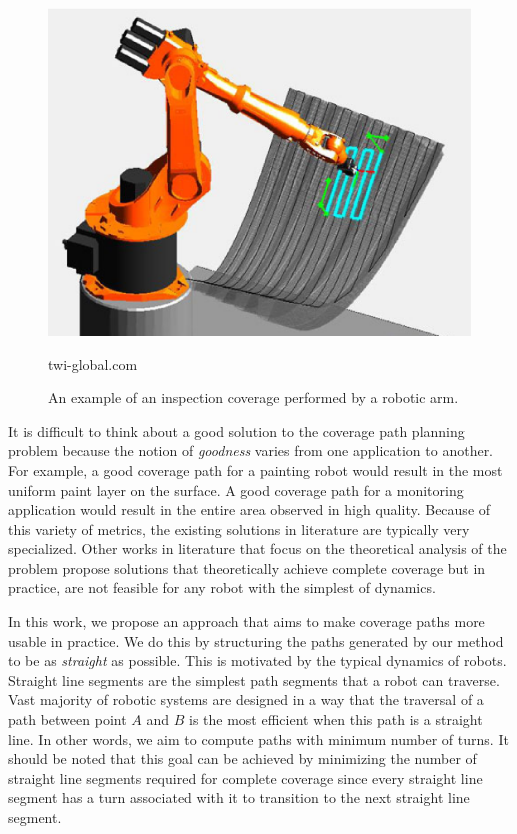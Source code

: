 \documentclass[../main.tex]{subfiles}
\begin{document}
\begin{figure}[]
	\centering
	\includegraphics[scale=0.5]{img/chapter_1/example_coverage.eps}
	\vskip-15pt
	\caption*{\tiny twi-global.com}
	\caption{An example of an inspection coverage performed by a robotic arm.}
	\label{img:example_coverage}
\end{figure}

It is difficult to think about a good solution to the coverage path planning problem because the notion of \emph{goodness} varies from one application to another. For example, a good coverage path for a painting robot would result in the most uniform paint layer on the surface. A good coverage path for a monitoring application would result in the entire area observed in high quality. Because of this variety of metrics, the existing solutions in literature are typically very specialized. Other works in literature that focus on the theoretical analysis of the problem propose solutions that theoretically achieve complete coverage but in practice, are not feasible for any robot with the simplest of dynamics.

In this work, we propose an approach that aims to make coverage paths more usable in practice. We do this by structuring the paths generated by our method to be as \emph{straight} as possible. This is motivated by the typical dynamics of robots. Straight line segments are the simplest path segments that a robot can traverse. Vast majority of robotic systems are designed in a way that the traversal of a path between point $A$ and $B$ is the most efficient when this path is a straight line. In other words, we aim to compute paths with minimum number of turns. It should be noted that this goal can be achieved by minimizing the number of straight line segments required for complete coverage since every straight line segment has a turn associated with it to transition to the next straight line segment.
\end{document}
